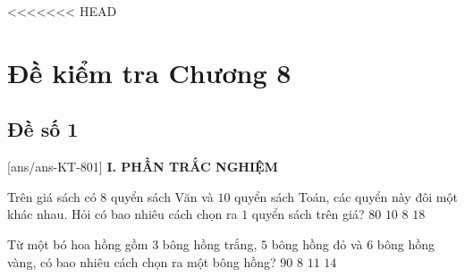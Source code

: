 <<<<<<< HEAD
\section*{Đề kiểm tra Chương 8}
\subsection*{Đề số 1}
\setcounter{ex}{0}\setcounter{bt}{0}
[ans/ans-KT-801]
\noindent\textbf{I. PHẦN TRẮC NGHIỆM}
\begin{ex}%
	Trên giá sách có $ 8 $ quyển sách Văn và $ 10 $ quyển sách Toán, các quyển này đôi một khác nhau. Hỏi có bao nhiêu cách chọn ra $ 1 $ quyển sách trên giá?
	\choice
	{$ 80 $}
	{$ 10 $}
	{$ 8 $}
	{\True $ 18 $}
\end{ex}
\begin{ex}%
	Từ một bó hoa hồng gồm $3$ bông hồng trắng, $5$ bông hồng đỏ và $6$ bông hồng vàng, có bao nhiêu cách chọn ra một bông hồng?
	\choice
	{$90$}
	{$8$}
	{$11$}
	{\True $14$}
\end{ex}

